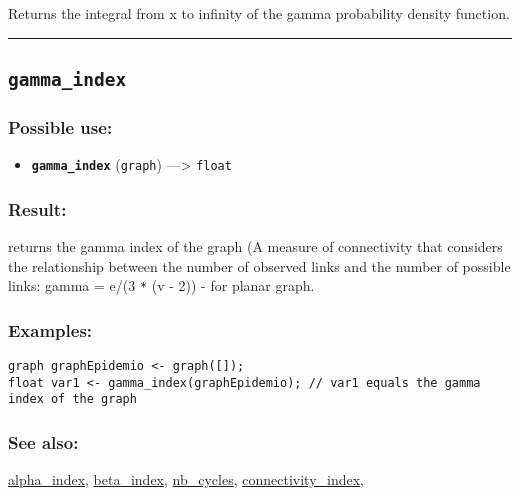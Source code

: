 \documentclass[]{book}
\providecommand{\tightlist}{%
  \setlength{\itemsep}{0pt}\setlength{\parskip}{0pt}}
\theoremstyle{definition}
\theoremstyle{definition}
\theoremstyle{definition}
\theoremstyle{remark}
\begin{document}
Returns the integral from x to infinity of the gamma probability density
function.

\begin{center}\rule{0.5\linewidth}{\linethickness}\end{center}

\subsection{\texorpdfstring{\texttt{gamma\_index}}{gamma\_index}}\label{gamma_index}

\subsubsection{Possible use:}\label{possible-use-183}

\begin{itemize}
\tightlist
\item
  \textbf{\texttt{gamma\_index}} (\texttt{graph}) ---\textgreater{}
  \texttt{float}
\end{itemize}

\subsubsection{Result:}\label{result-177}

returns the gamma index of the graph (A measure of connectivity that
considers the relationship between the number of observed links and the
number of possible links: gamma = e/(3 \texttt{*} (v - 2)) - for planar
graph.

\subsubsection{Examples:}\label{examples-133}

\begin{verbatim}
graph graphEpidemio <- graph([]);  
float var1 <- gamma_index(graphEpidemio); // var1 equals the gamma index of the graph
\end{verbatim}

\subsubsection{See also:}\label{see-also-101}

\href{OperatorsAA\#alpha_index}{alpha\_index},
\href{OperatorsBC\#beta_index}{beta\_index},
\href{OperatorsNR\#nb_cycles}{nb\_cycles},
\href{OperatorsBC\#connectivity_index}{connectivity\_index},
\end{document}
